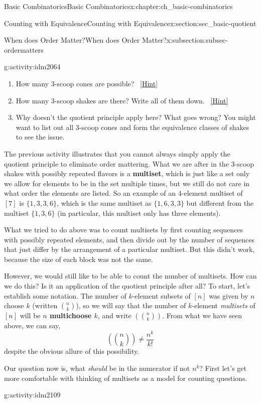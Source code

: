 \documentclass[oneside,10pt,]{book}
\newcommand{\terminology}[1]{\textbf{#1}}
\numberwithin{equation}{chapter}
\newcommand{\mchoose}[2]{\left(\!\binom{#1}{#2}\!\right)}
\begin{document}
\begin{chapterptx}{Basic Combinatorics}{}{Basic Combinatorics}{}{}{x:chapter:ch_basic-combinatorics}
\begin{sectionptx}{Counting with Equivalence}{}{Counting with Equivalence}{}{}{x:section:sec_basic-quotient}
\begin{subsectionptx}{When does Order Matter?}{}{When does Order Matter?}{}{}{x:subsection:subsec-ordermatters}
\begin{activity}{}{g:activity:idm2064}
\begin{enumerate}[font=\bfseries,label=(\alph*),ref=\alph*]
\item{}How many 3-scoop cones are possible?%
\qquad~\hfill{\tiny\hyperlink{g:hint:idm2070-back}{[Hint]}}\item{}How many 3-scoop shakes are there?  Write all of them down.%
\qquad~\hfill{\tiny\hyperlink{g:hint:idm2075-back}{[Hint]}}\item{}Why doesn't the quotient principle apply here?  What goes wrong?  You might want to list out all 3-scoop cones and form the equivalence classes of shakes to see the issue.%
\end{enumerate}
\end{activity}
The previous activity illustrates that you cannot always simply apply the quotient principle to eliminate order mattering.  What we are after in the 3-scoop shakes with possibly repeated flavors is a \terminology{multiset}, which is just like a set only we allow for elements to be in the set multiple times, but we still do not care in what order the elements are listed.  So an example of an \(4\)-element multiset of \([7]\) is \(\{1,3,3,6\}\), which is the same multiset as \(\{1,6,3,3\}\) but different from the multiset \(\{1,3,6\}\) (in particular, this multiset only has three elements).%
\par
What we tried to do above was to count multisets by first counting sequences with possibly repeated elements, and then divide out by the number of sequences that just differ by the arrangement of a particular multiset.  But this didn't work, because the size of each block was not the same.%
\par
However, we would still like to be able to count the number of multisets.  How can we do this?  Is it an application of the quotient principle after all?  To start, let's establish some notation.  The number of \(k\)-element subsets of \([n]\) was given by \(n\) choose \(k\) (written \(\binom{n}{k}\)), so we will say that the number of \(k\)-element \emph{multisets} of \([n]\) will be \terminology{\(n\) multichoose \(k\)}, and write \(\mchoose{n}{k}\).  From what we have seen above, we can say,%
\begin{equation*}
\mchoose{n}{k} \ne \frac{n^k}{k!}
\end{equation*}
despite the obvious allure of this possibility.%
\par
Our question now is, what \emph{should} be in the numerator if not \(n^k\)?  First let's get more comfortable with thinking of multisets as a model for counting questions.%
\begin{activity}{}{g:activity:idm2109}%

\end{activity}
\end{subsectionptx}
\end{sectionptx}
\end{chapterptx}
\end{document}
